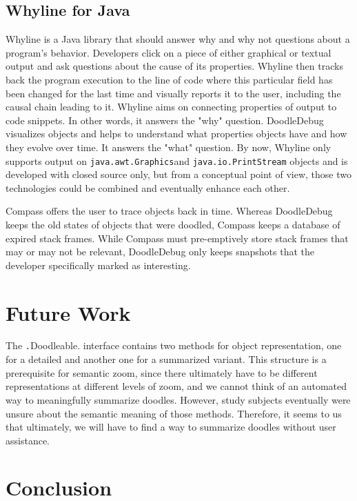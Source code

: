 \documentclass[english]{acm_proc_article-sp}
\begin{document}
\subsection{Whyline for Java}
Whyline\cite{Ko04a} is a Java library that should answer why and why not questions about a program's behavior. 
Developers  click on a piece of either graphical or textual output and ask questions about the cause of its properties. 
Whyline then tracks back the program execution to the line of code where this particular field has been changed for the last time and visually reports it to the user, including the causal chain leading to it. 
Whyline aims on connecting properties of output to code snippets. 
In other words, it answers the "why" question. 
DoodleDebug visualizes objects and helps to understand what properties objects have and how they evolve over time. 
It answers the "what" question. 
By now, Whyline only supports output on \texttt{java.awt.Graphics}and \texttt{java.io.PrintStream} objects and is developed with closed source only, but from a conceptual point of view, those two technologies could be combined and eventually enhance each other.

Compass\cite{Lien09a} offers the user to trace objects back in time. 
Whereas DoodleDebug keeps the old states of objects that were doodled, Compass keeps a database of expired stack frames. 
While Compass must pre-emptively store stack frames that may or may not be relevant, DoodleDebug only keeps snapshots that the developer specifically marked as interesting.

\section{Future Work}
The \texttt.Doodleable. interface contains two methods for object representation, one for a detailed and another one for a summarized variant. 
This structure is a prerequisite for semantic zoom, since there ultimately have to be different representations at different levels of zoom, and we cannot think of an automated way to meaningfully summarize doodles. 
However, study subjects eventually were unsure about the semantic meaning of those methods. Therefore, it seems to us that ultimately, we will have to find a way to summarize doodles without user assistance.

\section{Conclusion}
\end{document}
